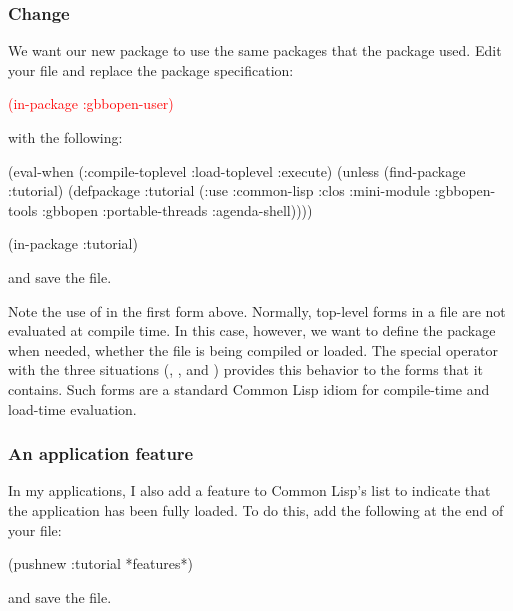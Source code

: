 \documentclass[10pt,twoside,english,pdftex]{article}
\begin{document}
\subsubsection*{Change }
%
We want our new  package to use the same packages that the
 package used. Edit your 
file and replace the  package specification:
%
\W\supp
\begin{example}
  \textcolor{red}{(in-package :gbbopen-user)}
\end{example}
%
with the following:
%
\W\supp\notpretop
\begin{example}
  (eval-when (:compile-toplevel :load-toplevel :execute)
    (unless (find-package :tutorial)
      (defpackage :tutorial
        (:use :common-lisp :clos :mini-module :gbbopen-tools :gbbopen 
              :portable-threads :agenda-shell))))

  (in-package :tutorial)
\end{example}
%
and save the file.

Note the use of  in the first form above.  Normally, top-level
forms in a file are not evaluated at compile time.  In this case, however, we
want to define the  package when needed, whether the file is
being compiled or loaded.  The  special operator with the
three situations (, , and ) provides this behavior to the forms that it contains.  Such
 forms are a standard Common Lisp idiom for compile-time and
load-time evaluation.

\subsubsection*{An application feature}
%
In my applications, I also add a feature to Common Lisp's 
list to indicate that the application has been fully loaded.  To do this, add
the following at the end of your  file:
%
\W\supp
\begin{example}
  (pushnew :tutorial *features*)
\end{example}
%
and save the file.
\end{document}
